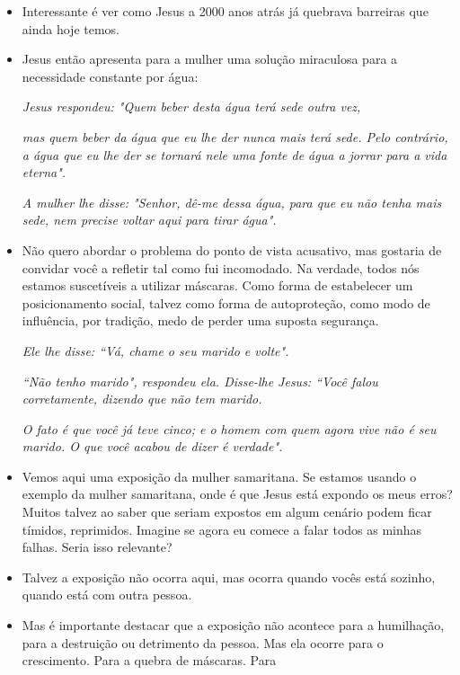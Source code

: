 \documentclass[12pt, legalpaper]{article}
\begin{document}
\begin{itemize}
   \item Interessante é ver como Jesus a 2000 anos atrás já quebrava barreiras que ainda hoje temos.
   
   \item Jesus então apresenta para a mulher uma solução miraculosa para a necessidade constante por água:

   \emph{Jesus respondeu: "Quem beber desta água terá sede outra vez,}

   \emph{mas quem beber da água que eu lhe der nunca mais terá sede. Pelo contrário, a água que eu lhe der se tornará nele uma fonte de água a jorrar para a vida eterna".}

   \emph{A mulher lhe disse: "Senhor, dê-me dessa água, para que eu não tenha mais sede, nem precise voltar aqui para tirar água".}

   \item Não quero abordar o problema do ponto de vista acusativo, mas gostaria de convidar você a refletir tal como fui incomodado. Na verdade, todos nós estamos suscetíveis a utilizar máscaras. Como forma de estabelecer um posicionamento social, talvez como forma de autoproteção, como modo de influência, por tradição, medo de perder uma suposta segurança.
   
   \emph{Ele lhe disse: ``Vá, chame o seu marido e volte".}

   \emph{``Não tenho marido", respondeu ela. Disse-lhe Jesus: ``Você falou corretamente, dizendo que não tem marido.}

   \emph{O fato é que você já teve cinco; e o homem com quem agora vive não é seu marido. O que você acabou de dizer é verdade".}

   \item Vemos aqui uma exposição da mulher samaritana. Se estamos usando o exemplo da mulher samaritana, onde é que Jesus está expondo os meus erros? Muitos talvez ao saber que seriam expostos em algum cenário podem ficar tímidos, reprimidos. Imagine se agora eu comece a falar todos as minhas falhas. Seria isso relevante?

\newpage
   \item Talvez a exposição não ocorra aqui, mas ocorra quando vocês está sozinho, quando está com outra pessoa.
   
   \item Mas é importante destacar que a exposição não acontece para a humilhação, para a destruição ou detrimento da pessoa. Mas ela ocorre para o crescimento. Para a quebra de máscaras. Para 


\end{itemize}
\end{document}
